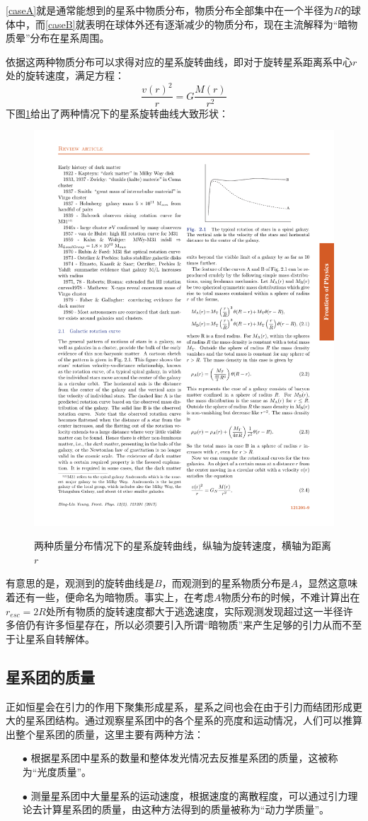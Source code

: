 \documentclass{ctexart}
\newcommand{\dotemph}[1]{\CJKunderdot{#1}}
\begin{document}
	\ref{caseA}就是通常能想到的星系中物质分布，物质分布全部集中在一个半径为$R$的球体中，而\ref{caseB}就表明在球体外还有逐渐减少的物质分布，现在主流解释为“暗物质晕”分布在星系周围。
	
	依据这两种物质分布可以求得对应的星系旋转曲线，即对于旋转星系距离系中心$r$处的旋转速度，满足方程：
	\begin{equation}
		\frac{v(r)^2}{r}=G\frac{M(r)}{r^2}
	\end{equation}
	下图\ref{fig:3}给出了两种情况下的星系旋转曲线大致形状：
	\begin{figure}[h]
		\centering
		\includegraphics[width=.618\linewidth]{figs/fig3.pdf}
		\label{fig:3}
		\caption{两种质量分布情况下的星系旋转曲线，纵轴为旋转速度，横轴为距离$r$}
	\end{figure}
	
	有意思的是，观测到的旋转曲线是$B$，而观测到的星系物质分布是$A$，显然这意味着还有一些\dotemph{我们看不见的物质}，便命名为暗物质。事实上，在考虑$A$物质分布的时候，不难计算出在$r_{esc}=2R$处所有物质的旋转速度都大于逃逸速度，实际观测发现超过这一半径许多倍仍有许多恒星存在，所以必须要引入所谓“暗物质”来产生足够的引力从而不至于让星系自转解体。
	
	\subsection{星系团的质量}
	正如恒星会在引力的作用下聚集形成星系，星系之间也会在由于引力而结团形成更大的星系团结构。通过观察星系团中的各个星系的亮度和运动情况，人们可以推算出整个星系团的质量，这里主要有两种方法：
	\begin{enumerate}
		\item[$\bullet$] 根据星系团中星系的数量和整体发光情况去反推星系团的质量，这被称为“光度质量”。
		\item[$\bullet$] 测量星系团中大量星系的运动速度，根据速度的离散程度，可以通过引力理论去计算星系团的质量，由这种方法得到的质量被称为“动力学质量”。
	\end{enumerate}
	
\end{document}

